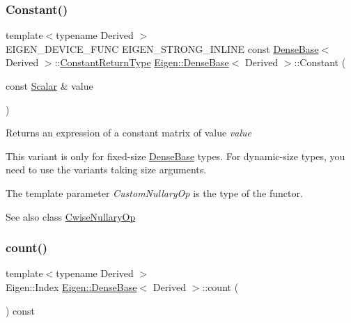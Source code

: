 \subsubsection{\texorpdfstring{Constant()}{Constant()}\hspace{0.1cm}{\footnotesize\ttfamily [3/3]}}
{\footnotesize\ttfamily template$<$typename Derived $>$ \\
E\+I\+G\+E\+N\+\_\+\+D\+E\+V\+I\+C\+E\+\_\+\+F\+U\+NC E\+I\+G\+E\+N\+\_\+\+S\+T\+R\+O\+N\+G\+\_\+\+I\+N\+L\+I\+NE const \mbox{\hyperlink{class_eigen_1_1_dense_base}{Dense\+Base}}$<$ Derived $>$\+::\mbox{\hyperlink{class_eigen_1_1_cwise_nullary_op}{Constant\+Return\+Type}} \mbox{\hyperlink{class_eigen_1_1_dense_base}{Eigen\+::\+Dense\+Base}}$<$ Derived $>$\+::Constant (\begin{DoxyParamCaption}\item[{const \mbox{\hyperlink{class_eigen_1_1_dense_base_a5feed465b3a8e60c47e73ecce83e39a2}{Scalar}} \&}]{value }\end{DoxyParamCaption})\hspace{0.3cm}{\ttfamily [static]}}

\begin{DoxyReturn}{Returns}
an expression of a constant matrix of value {\itshape value} 
\end{DoxyReturn}
This variant is only for fixed-\/size \mbox{\hyperlink{class_eigen_1_1_dense_base}{Dense\+Base}} types. For dynamic-\/size types, you need to use the variants taking size arguments.

The template parameter {\itshape Custom\+Nullary\+Op} is the type of the functor.

\begin{DoxySeeAlso}{See also}
class \mbox{\hyperlink{class_eigen_1_1_cwise_nullary_op}{Cwise\+Nullary\+Op}} 
\end{DoxySeeAlso}
\mbox{\label{class_eigen_1_1_dense_base_a229be090c665b9bf7d1fcdfd1ab6e0c1}} 
\subsubsection{\texorpdfstring{count()}{count()}}
{\footnotesize\ttfamily template$<$typename Derived $>$ \\
Eigen\+::\+Index \mbox{\hyperlink{class_eigen_1_1_dense_base}{Eigen\+::\+Dense\+Base}}$<$ Derived $>$\+::count (\begin{DoxyParamCaption}{ }\end{DoxyParamCaption}) const\hspace{0.3cm}{\ttfamily [inline]}}

